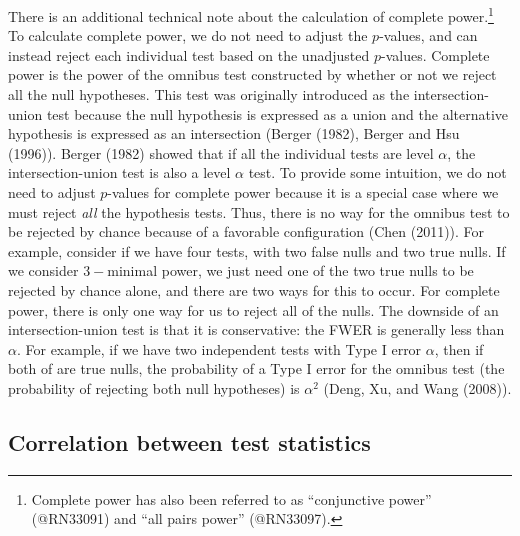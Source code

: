 \documentclass[
]{article}
\begin{document}
There is an additional technical note about the calculation of complete
power.\footnote{Complete power has also been referred to as “conjunctive power” (@RN33091) and “all pairs power” (@RN33097).}
To calculate complete power, we do not need to adjust the \(p\)-values,
and can instead reject each individual test based on the unadjusted
\(p\)-values. Complete power is the power of the omnibus test
constructed by whether or not we reject all the null hypotheses. This
test was originally introduced as the intersection-union test because
the null hypothesis is expressed as a union and the alternative
hypothesis is expressed as an intersection (Berger (1982), Berger and
Hsu (1996)). Berger (1982) showed that if all the individual tests are
level \(\alpha\), the intersection-union test is also a level \(\alpha\)
test. To provide some intuition, we do not need to adjust \(p\)-values
for complete power because it is a special case where we must reject
\emph{all} the hypothesis tests. Thus, there is no way for the omnibus
test to be rejected by chance because of a favorable configuration (Chen
(2011)). For example, consider if we have four tests, with two false
nulls and two true nulls. If we consider \(3-\)minimal power, we just
need one of the two true nulls to be rejected by chance alone, and there
are two ways for this to occur. For complete power, there is only one
way for us to reject all of the nulls. The downside of an
intersection-union test is that it is conservative: the FWER is
generally less than \(\alpha\). For example, if we have two independent
tests with Type I error \(\alpha\), then if both of are true nulls, the
probability of a Type I error for the omnibus test (the probability of
rejecting both null hypotheses) is \(\alpha^2\) (Deng, Xu, and Wang
(2008)).

\subsection{Correlation between test statistics}
\label{sec:corr}
\end{document}
